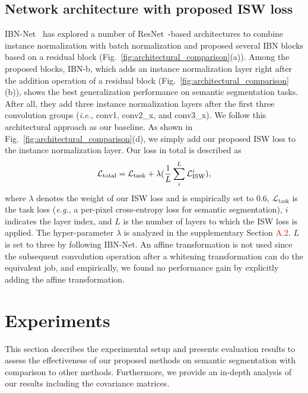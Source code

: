 \documentclass[final]{latex/cvpr}
\newcommand{\todow}[1]{\textcolor{red}{#1}}
\begin{document}
\vspace*{-0.0cm}
\subsection{Network architecture with proposed ISW loss}\label{sec:network_architecture}
\vspace*{-0.05cm}
IBN-Net~\cite{pan2018two} has explored a number of ResNet~\cite{he2016deep}-based architectures to combine instance normalization with batch normalization and proposed several IBN blocks based on a residual block (Fig.~\ref{fig:architectural_comparison}(a)). Among the proposed blocks, IBN-b, which adds an instance normalization layer right after the addition operation of a residual block (Fig.~\ref{fig:architectural_comparison}(b)), shows the best generalization performance on semantic segmentation tasks. After all, they add three instance normalization layers after the first three convolution groups (\textit{i.e.,} conv1, conv2\_x, and conv3\_x). We follow this architectural approach as our baseline. As shown in Fig.~\ref{fig:architectural_comparison}(d), we simply add our proposed ISW loss to the instance normalization layer.
Our loss in total is described as
\vspace{-0.25cm}
\begin{equation} \label{eq_final_loss}
\mathcal{L}_{\text{total}} = \mathcal{L}_{\text{task}} + \lambda(\frac{1}{L}\sum_i^L\mathcal{L}_{\text{ISW}}^i),
\vspace{-0.15cm}
\end{equation}
where $\lambda$ denotes the weight of our ISW loss and is empirically set to 0.6, $\mathcal{L}_{\text{task}}$ is the task loss (\textit{e.g.,} a per-pixel cross-entropy loss for semantic segmentation), $i$ indicates the layer index, and $L$ is the number of layers to which the ISW loss is applied. The hyper-parameter $\lambda$ is analyzed in the supplementary Section \todow{A.2}. $L$ is set to three by following IBN-Net.
An affine transformation is not used since the subsequent convolution operation after a whitening transformation can do the equivalent job, and empirically, we found no performance gain by explicitly adding the affine transformation.
\vspace{-0.1cm}










\vspace{-0.0cm}
\section{Experiments}
\vspace{-0.1cm}
This section describes the experimental setup and presents evaluation results to assess the effectiveness of our proposed methods on semantic segmentation with comparison to other methods. Furthermore, we provide an in-depth analysis of our results including the covariance matrices.
\vspace{-0.07cm}
\end{document}

